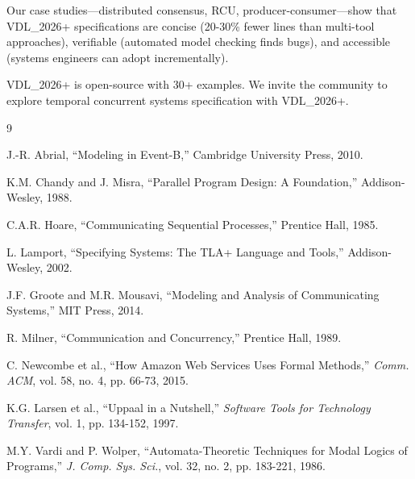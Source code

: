 \documentclass[conference]{IEEEtran}
\begin{document}
Our case studies---distributed consensus, RCU, producer-consumer---show that VDL\_2026+ specifications are concise (20-30\% fewer lines than multi-tool approaches), verifiable (automated model checking finds bugs), and accessible (systems engineers can adopt incrementally).

VDL\_2026+ is open-source with 30+ examples. We invite the community to explore temporal concurrent systems specification with VDL\_2026+.

\begin{thebibliography}{9}

J.-R. Abrial, ``Modeling in Event-B,'' Cambridge University Press, 2010.

K.M. Chandy and J. Misra, ``Parallel Program Design: A Foundation,'' Addison-Wesley, 1988.

C.A.R. Hoare, ``Communicating Sequential Processes,'' Prentice Hall, 1985.

L. Lamport, ``Specifying Systems: The TLA+ Language and Tools,'' Addison-Wesley, 2002.

J.F. Groote and M.R. Mousavi, ``Modeling and Analysis of Communicating Systems,'' MIT Press, 2014.

R. Milner, ``Communication and Concurrency,'' Prentice Hall, 1989.

C. Newcombe et al., ``How Amazon Web Services Uses Formal Methods,'' \textit{Comm. ACM}, vol. 58, no. 4, pp. 66-73, 2015.

K.G. Larsen et al., ``Uppaal in a Nutshell,'' \textit{Software Tools for Technology Transfer}, vol. 1, pp. 134-152, 1997.

M.Y. Vardi and P. Wolper, ``Automata-Theoretic Techniques for Modal Logics of Programs,'' \textit{J. Comp. Sys. Sci.}, vol. 32, no. 2, pp. 183-221, 1986.

\end{thebibliography}
\end{document}
